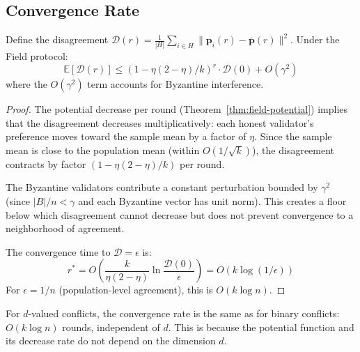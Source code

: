 \subsection{Convergence Rate}

\begin{lemma}
\label{lem:field-convergence-rate}
Define the disagreement $\mathcal{D}(r) = \frac{1}{|H|}\sum_{i \in H} \|\mathbf{p}_i(r) - \bar{\mathbf{p}}(r)\|^2$.
Under the Field protocol:
\[
\mathbb{E}[\mathcal{D}(r)] \leq (1 - \eta(2-\eta)/k)^r \cdot \mathcal{D}(0) + O(\gamma^2)
\]
where the $O(\gamma^2)$ term accounts for Byzantine interference.
\end{lemma}

\begin{proof}
The potential decrease per round (Theorem~\ref{thm:field-potential}) implies that the disagreement
decreases multiplicatively: each honest validator's preference moves toward the sample mean
by a factor of $\eta$. Since the sample mean is close to the population mean (within $O(1/\sqrt{k})$),
the disagreement contracts by factor $(1 - \eta(2-\eta)/k)$ per round.

The Byzantine validators contribute a constant perturbation bounded by $\gamma^2$ (since
$|B|/n < \gamma$ and each Byzantine vector has unit norm). This creates a floor below
which disagreement cannot decrease but does not prevent convergence to a neighborhood of
agreement.

The convergence time to $\mathcal{D} = \epsilon$ is:
\[
r^* = O\left(\frac{k}{\eta(2-\eta)} \ln \frac{\mathcal{D}(0)}{\epsilon}\right) = O(k \log(1/\epsilon))
\]
For $\epsilon = 1/n$ (population-level agreement), this is $O(k \log n)$.
\end{proof}

\begin{corollary}
\label{cor:multi}
For $d$-valued conflicts, the convergence rate is the same as for binary conflicts:
$O(k \log n)$ rounds, independent of $d$. This is because the potential function and
its decrease rate do not depend on the dimension $d$.
\end{corollary}

